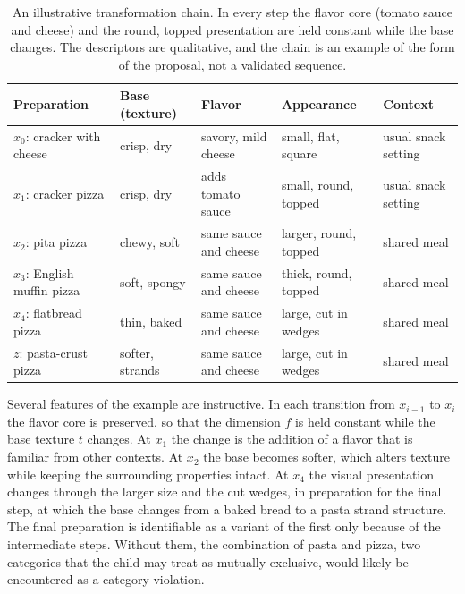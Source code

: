 \documentclass[11pt]{article}
\theoremstyle{remark}
\begin{document}
\begin{table}[h]
\centering
\small
\renewcommand{\arraystretch}{1.25}
\begin{tabular}{@{}p{}p{}p{}p{}p{}@{}}
\toprule
Preparation & Base (texture) & Flavor & Appearance & Context \\
\midrule
$x_0$: cracker with cheese & crisp, dry & savory, mild cheese & small, flat, square & usual snack setting \\
$x_1$: cracker pizza & crisp, dry & adds tomato sauce & small, round, topped & usual snack setting \\
$x_2$: pita pizza & chewy, soft & same sauce and cheese & larger, round, topped & shared meal \\
$x_3$: English muffin pizza & soft, spongy & same sauce and cheese & thick, round, topped & shared meal \\
$x_4$: flatbread pizza & thin, baked & same sauce and cheese & large, cut in wedges & shared meal \\
$z$: pasta-crust pizza & softer, strands & same sauce and cheese & large, cut in wedges & shared meal \\
\bottomrule
\end{tabular}
\caption{An illustrative transformation chain. In every step the flavor core (tomato sauce and cheese) and the round, topped presentation are held constant while the base changes. The descriptors are qualitative, and the chain is an example of the form of the proposal, not a validated sequence.}
\label{tab:chain}
\end{table}

Several features of the example are instructive. In each transition from $x_{i-1}$ to $x_i$ the flavor core is preserved, so that the dimension $f$ is held constant while the base texture $t$ changes. At $x_1$ the change is the addition of a flavor that is familiar from other contexts. At $x_2$ the base becomes softer, which alters texture while keeping the surrounding properties intact. At $x_4$ the visual presentation changes through the larger size and the cut wedges, in preparation for the final step, at which the base changes from a baked bread to a pasta strand structure. The final preparation is identifiable as a variant of the first only because of the intermediate steps. Without them, the combination of pasta and pizza, two categories that the child may treat as mutually exclusive, would likely be encountered as a category violation.
\end{document}
